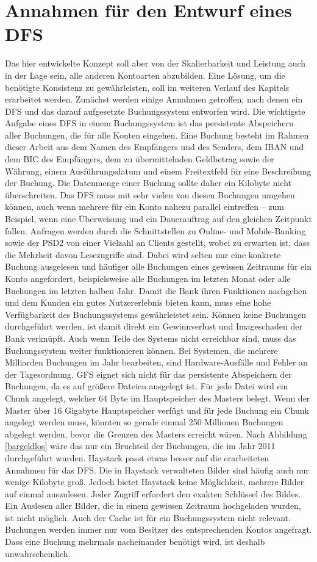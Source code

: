 \documentclass[12pt,oneside,a4paper,parskip]{scrbook}
\begin{document}
\section{Annahmen für den Entwurf eines DFS}
Das hier entwickelte Konzept soll aber von der Skalierbarkeit und Leistung auch in der Lage sein, alle anderen Kontoarten abzubilden. Eine Lösung, um die benötigte Konsistenz zu gewährleisten, soll im weiteren Verlauf des Kapitels erarbeitet werden. Zunächst werden einige Annahmen getroffen, nach denen ein DFS und das darauf aufgesetzte Buchungssystem entworfen wird. Die wichtigste Aufgabe eines DFS in einem Buchungssystem ist das persistente Abspeichern aller Buchungen, die für alle Konten eingehen. Eine Buchung besteht im Rahmen dieser Arbeit aus dem Namen des Empfängers und des Senders, dem IBAN und dem BIC des Empfängers, dem zu übermittelnden Geldbetrag sowie der Währung, einem Ausführungsdatum und einem Freitextfeld für eine Beschreibung der Buchung. Die Datenmenge einer Buchung sollte daher ein Kilobyte nicht überschreiten. Das DFS muss mit sehr vielen von diesen Buchungen umgehen können, auch wenn mehrere für ein Konto nahezu parallel eintreffen – zum Beispiel, wenn eine Überweisung und ein Dauerauftrag auf den gleichen Zeitpunkt fallen. Anfragen werden durch die Schnittstellen zu Online- und Mobile-Banking sowie der PSD2 von einer Vielzahl an Clients gestellt, wobei zu erwarten ist, dass die Mehrheit davon Lesezugriffe sind. Dabei wird selten nur eine konkrete Buchung ausgelesen und häufiger alle Buchungen eines gewissen Zeitraums für ein Konto angefordert, beispielsweise alle Buchungen im letzten Monat oder alle Buchungen im letzten halben Jahr. Damit die Bank ihren Funktionen nachgehen und dem Kunden ein gutes Nutzererlebnis bieten kann, muss eine hohe Verfügbarkeit des Buchungssystems gewährleistet sein. Können keine Buchungen durchgeführt werden, ist damit direkt ein Gewinnverlust und Imageschaden der Bank verknüpft. Auch wenn Teile des Systems nicht erreichbar sind, muss das Buchungssystem weiter funktionieren können. Bei Systemen, die mehrere Milliarden Buchungen im Jahr bearbeiten, sind Hardware-Ausfälle und Fehler an der Tagesordnung. 
GFS eignet sich nicht für das persistente Abspeichern der Buchungen, da es auf größere Dateien ausgelegt ist. Für jede Datei wird ein Chunk angelegt, welcher 64 Byte im Hauptspeicher des Masters belegt. Wenn der Master über 16 Gigabyte Hauptspeicher verfügt und für jede Buchung ein Chunk angelegt werden muss, könnten so gerade einmal 250 Millionen Buchungen abgelegt werden, bevor die Grenzen des Masters erreicht wären. Nach Abbildung \ref{bargeldlos} wäre das nur ein Bruchteil der Buchungen, die im Jahr 2011 durchgeführt wurden. Haystack passt etwas besser auf die erarbeiteten Annahmen für das DFS. Die in Haystack verwalteten Bilder sind häufig auch nur wenige Kilobyte groß. Jedoch bietet Haystack keine Möglichkeit, mehrere Bilder auf einmal auszulesen. Jeder Zugriff erfordert den exakten Schlüssel des Bildes. Ein Auslesen aller Bilder, die in einem gewissen Zeitraum hochgeladen wurden, ist nicht möglich. Auch der Cache ist für ein Buchungssystem nicht relevant. Buchungen werden immer nur vom Besitzer des entsprechenden Kontos angefragt. Dass eine Buchung mehrmals nacheinander benötigt wird, ist deshalb unwahrscheinlich.
\end{document}
